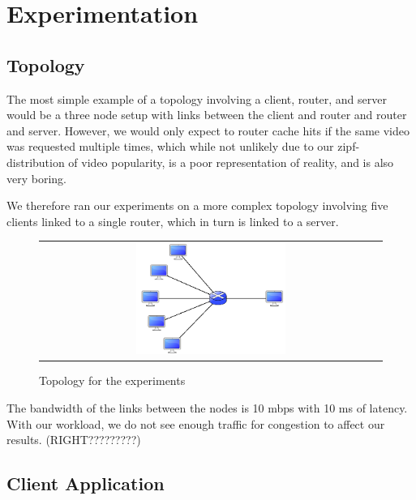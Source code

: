 \section{Experimentation} \label{sec:experimentation}

\subsection{Topology} \label{sec:topology}

The most simple example of a topology involving a client, router, and server
would be a three node setup with links between the client and router and router
and server. However, we would only expect to router cache hits if the same video
was requested multiple times, which while not unlikely due to our
zipf-distribution of video popularity, is a poor representation of reality, and
is also very boring.

We therefore ran our experiments on a more complex topology involving five
clients linked to a single router, which in turn is linked to a server.

\begin{figure}[h]
    \begin{center}
        \begin{tabular}{c}
            \includegraphics[width=0.45\textwidth]{fig/topology.png} \\
        \end{tabular}
        \caption{Topology for the experiments}
        \label{fig:topology}
    \end{center}
\end{figure}

The bandwidth of the links between the nodes is 10  mbps with
10 ms of latency. With our workload, we do not  see enough traffic for
congestion to affect our results. (RIGHT?????????)



\subsection{Client Application} \label{sec:client}


